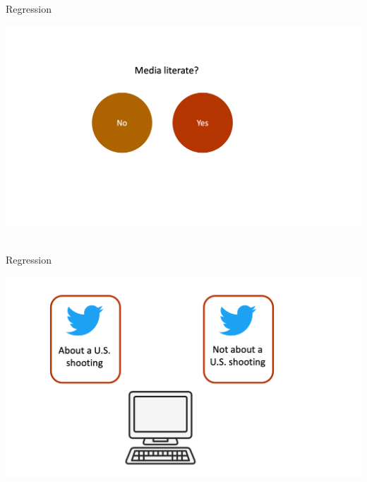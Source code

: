 \documentclass[handout]{beamer}
\begin{document}
\begin{frame}{Regression}
	
	\begin{center}
		\includegraphics{../pictures/medialiteracydummy.png} \\\
	\end{center}
	
	
	
	
	
\end{frame}


\begin{frame}{Regression}
	
	\begin{center}
		\includegraphics{../pictures/Zhangetal_1.png} \\\
	\end{center}
	
	\begin{tiny}
	\end{tiny}

	
		
\end{frame}
\end{document}
